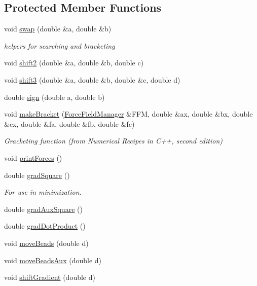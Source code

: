 \subsection*{Protected Member Functions}
\begin{DoxyCompactItemize}
\item 
void \hyperlink{classCGMethod_a98910fcbef9f0af69076c955b887c254}{swap} (double \&a, double \&b)
\begin{DoxyCompactList}\small\item\em helpers for searching and bracketing \end{DoxyCompactList}\item 
void \hyperlink{classCGMethod_ac091059dd8c44e8e4ec372767f18f1c9}{shift2} (double \&a, double \&b, double c)
\item 
void \hyperlink{classCGMethod_a947d6e38d75fe84a08f0fc071c94c225}{shift3} (double \&a, double \&b, double \&c, double d)
\item 
double \hyperlink{classCGMethod_aea6d1129677d44e11fe2afb08b5ca52c}{sign} (double a, double b)
\item 
void \hyperlink{classCGMethod_a276c57252367bec9fcf08ae1e7c7df71}{make\+Bracket} (\hyperlink{classForceFieldManager}{Force\+Field\+Manager} \&F\+F\+M, double \&ax, double \&bx, double \&cx, double \&fa, double \&fb, double \&fc)
\begin{DoxyCompactList}\small\item\em Gracketing function (from Numerical Recipes in C++, second edition) \end{DoxyCompactList}\item 
void \hyperlink{classCGMethod_abd5135fdbe89793bfb5926f9dcc6de7e}{print\+Forces} ()
\end{DoxyCompactItemize}
{\bf }\par
\begin{DoxyCompactItemize}
\item 
double \hyperlink{classCGMethod_aa2af8a3ecad085f6c07f759bfe50ccb1}{grad\+Square} ()
\begin{DoxyCompactList}\small\item\em For use in minimization. \end{DoxyCompactList}\item 
double \hyperlink{classCGMethod_ab9c35ec6681e97472d0442a37163d46d}{grad\+Aux\+Square} ()
\item 
double \hyperlink{classCGMethod_a531b7d0bc38b6372dc323185f51233dc}{grad\+Dot\+Product} ()
\item 
void \hyperlink{classCGMethod_afe717a6a06f677933b55628ea4d0014d}{move\+Beads} (double d)
\item 
void \hyperlink{classCGMethod_a885a9627cc4e8b2db8f3384f29cd4069}{move\+Beads\+Aux} (double d)
\item 
void \hyperlink{classCGMethod_a7e8d5b8d77aff6c4564c4b1d72ab5ace}{shift\+Gradient} (double d)
\end{DoxyCompactItemize}

